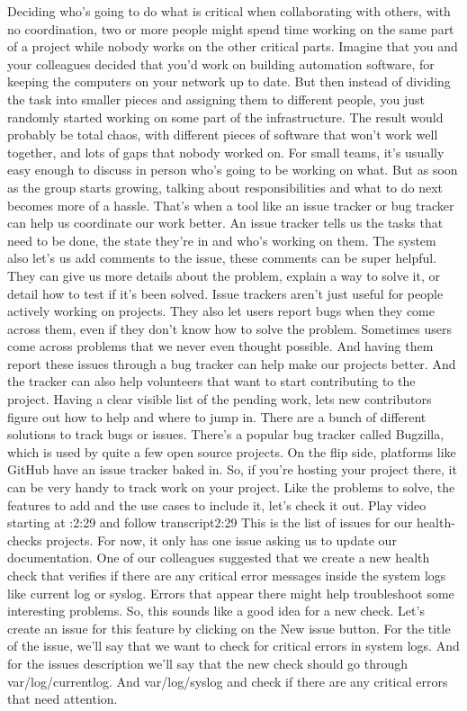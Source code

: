 	
	Deciding who's going to do what is critical when collaborating with others, with no coordination, two or more people might spend time working on the same part of a project while nobody works on the other critical parts. Imagine that you and your colleagues decided that you'd work on building automation software, for keeping the computers on your network up to date. But then instead of dividing the task into smaller pieces and assigning them to different people, you just randomly started working on some part of the infrastructure. The result would probably be total chaos, with different pieces of software that won't work well together, and lots of gaps that nobody worked on. For small teams, it's usually easy enough to discuss in person who's going to be working on what. But as soon as the group starts growing, talking about responsibilities and what to do next becomes more of a hassle. That's when a tool like an issue tracker or bug tracker can help us coordinate our work better. An issue tracker tells us the tasks that need to be done, the state they're in and who's working on them. The system also let's us add comments to the issue, these comments can be super helpful. They can give us more details about the problem, explain a way to solve it, or detail how to test if it's been solved. Issue trackers aren't just useful for people actively working on projects. They also let users report bugs when they come across them, even if they don't know how to solve the problem. Sometimes users come across problems that we never even thought possible. And having them report these issues through a bug tracker can help make our projects better. And the tracker can also help volunteers that want to start contributing to the project. Having a clear visible list of the pending work, lets new contributors figure out how to help and where to jump in. There are a bunch of different solutions to track bugs or issues. There's a popular bug tracker called Bugzilla, which is used by quite a few open source projects. On the flip side, platforms like GitHub have an issue tracker baked in. So, if you're hosting your project there, it can be very handy to track work on your project. Like the problems to solve, the features to add and the use cases to include it, let's check it out.
	Play video starting at :2:29 and follow transcript2:29
	This is the list of issues for our health-checks projects. For now, it only has one issue asking us to update our documentation. One of our colleagues suggested that we create a new health check that verifies if there are any critical error messages inside the system logs like current log or syslog. Errors that appear there might help troubleshoot some interesting problems. So, this sounds like a good idea for a new check. Let's create an issue for this feature by clicking on the New issue button. For the title of the issue, we'll say that we want to check for critical errors in system logs. And for the issues description we'll say that the new check should go through var/log/currentlog. And var/log/syslog and check if there are any critical errors that need attention.
